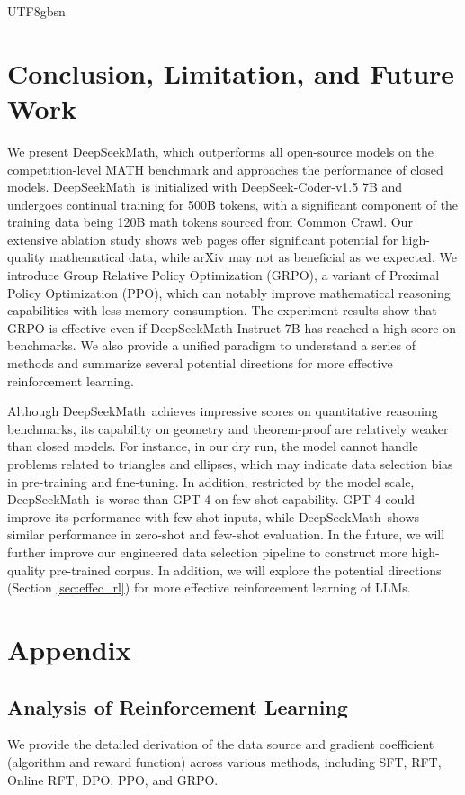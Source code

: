 \documentclass[11pt, a4paper, logo, copyright, nonumbering]{deepseek}
\newcommand{\spmath}{DeepSeekMath}
\begin{document}
\begin{CJK*}{UTF8}{gbsn}
\section{Conclusion, Limitation, and Future Work}
We present \spmath, which outperforms all open-source models on the competition-level MATH benchmark and approaches the performance of closed models.
\spmath~is initialized with DeepSeek-Coder-v1.5 7B and undergoes continual training for 500B tokens, with a significant component of the training data being 120B math tokens sourced from Common Crawl.
Our extensive ablation study shows web pages offer significant potential for high-quality mathematical data, while arXiv may not as beneficial as we expected.
We introduce Group Relative Policy Optimization (GRPO), a variant of Proximal Policy Optimization (PPO), which can notably improve mathematical reasoning capabilities with less memory consumption.
The experiment results show that GRPO is effective even if \spmath-Instruct 7B has reached a high score on benchmarks. 
We also provide a unified paradigm to understand a series of methods and summarize several potential directions for more effective reinforcement learning.

Although \spmath~achieves impressive scores on quantitative reasoning benchmarks, its capability on geometry and theorem-proof are relatively weaker than closed models.
For instance, in our dry run, the model cannot handle problems related to triangles and ellipses, which may indicate data selection bias in pre-training and fine-tuning. In addition, restricted by the model scale, \spmath~is worse than GPT-4 on few-shot capability.
GPT-4 could improve its performance with few-shot inputs, while \spmath~shows similar performance in zero-shot and few-shot evaluation.
In the future, we will further improve our engineered data selection pipeline to construct more high-quality pre-trained corpus.
In addition, we will explore the potential directions (Section \ref{sec:effec_rl}) for more effective reinforcement learning of LLMs.

\newpage



\newpage
\appendix

\section{Appendix}
\subsection{Analysis of Reinforcement Learning}
\label{app:analysis-rl}
We provide the detailed derivation of the data source and gradient coefficient (algorithm and reward function) across various methods, including SFT, RFT, Online RFT, DPO, PPO, and GRPO.



\end{CJK*}
\end{document}
